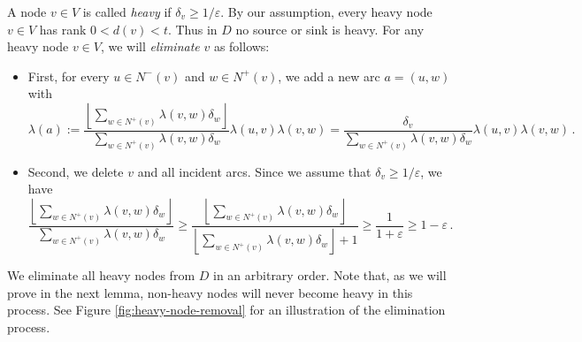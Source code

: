 \documentclass[11pt]{article}
\newcommand{\floor}[1]{\left\lfloor #1 \right\rfloor}
\newcommand{\eps}{\varepsilon}
\newcommand{\numrounds}{t}
\newcommand{\rhs}{\delta}
\newcommand{\set}[1]{\left\{#1\right\}}
\theoremstyle{remark}
\begin{document}
A node $v \in V$ is called \emph{heavy} if $\rhs_v \ge 1/\eps$.
By our assumption, every heavy node $v \in V$ has rank $0 < d(v) < \numrounds$. Thus in $D$ no source or sink is heavy.
For any heavy node $v \in V$, we will \emph{eliminate} $v$ as follows:
\begin{itemize}
    \item First, for every $u \in N^-(v)$ and $w \in N^+(v)$, we add a new arc $a = (u,w)$ with 
    $$
    \lambda(a) :=
    \frac{\floor{\sum_{w \in N^{+}(v)} \lambda(v,w) \rhs_w}}{\sum_{w \in N^{+}(v)} \lambda(v,w) \rhs_w} \lambda(u,v) \lambda(v,w)
    = \frac{\rhs_v}{\sum_{w \in N^{+}(v)} \lambda(v,w) \rhs_w} \lambda(u,v) \lambda(v,w)\,.
    $$
    \item Second, we delete $v$ and all incident arcs. Since we assume that $\rhs_v \ge 1/\eps$, we have
    $$
    \frac{\floor{\sum_{w \in N^{+}(v)} \lambda(v,w) \rhs_w}}{\sum_{w \in N^{+}(v)} \lambda(v,w) \rhs_w} \geq \frac{\floor{\sum_{w \in N^{+}(v)} \lambda(v,w) \rhs_w}}{\floor{\sum_{w \in N^{+}(v)} \lambda(v,w) \rhs_w}+1} \ge \frac{1}{1+\eps} \ge 1-\eps\,.
    $$
\end{itemize}
We eliminate all heavy nodes from $D$ in an arbitrary order.
Note that, as we will prove in the next lemma, non-heavy nodes will never become heavy in this process.
See Figure \ref{fig:heavy-node-removal} for an illustration of the elimination process.
\end{document}
